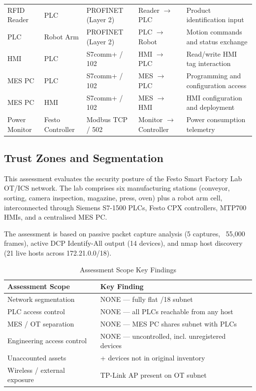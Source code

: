 {\begin{longtable}{p{2.2cm} p{2.2cm} p{2.6cm} p{3.2cm} p{4.2cm}}
RFID Reader & PLC &
PROFINET (Layer 2) &
Reader $\rightarrow$ PLC &
Product identification input \\

PLC & Robot Arm &
PROFINET (Layer 2) &
PLC $\rightarrow$ Robot &
Motion commands and status exchange \\

HMI & PLC &
S7comm+ / 102 &
HMI $\rightarrow$ PLC &
Read/write HMI tag interaction \\

MES PC & PLC &
S7comm+ / 102 &
MES $\rightarrow$ PLC &
Programming and configuration access \\

MES PC & HMI &
S7comm+ / 102 &
MES $\rightarrow$ HMI &
HMI configuration and deployment \\

Power Monitor & Festo Controller &
Modbus TCP / 502 &
Monitor $\rightarrow$ Controller &
Power consumption telemetry \\

\end{longtable}
}


\subsection{Trust Zones and Segmentation}

This assessment evaluates the security posture of the Festo Smart Factory Lab OT/ICS network. The lab comprises six manufacturing stations (conveyor, sorting, camera inspection, magazine, press, oven) plus a robot arm cell, interconnected through Siemens S7-1500 PLCs, Festo CPX controllers, MTP700 HMIs, and a centralised MES PC.

The assessment is based on passive packet capture analysis (5 captures, ~55,000 frames), active DCP Identify-All output (14 devices), and nmap host discovery (21 live hosts across 172.21.0.0/18).

\begin{table}[h!]
\centering

\begin{tabular}{@{}l>{\raggedright\arraybackslash}p{}@{}}
\toprule
\textbf{Assessment Scope} & \textbf{Key Finding} \\
\midrule
Network segmentation & NONE — fully flat /18 subnet \\
PLC access control & NONE — all PLCs reachable from any host \\
MES / OT separation & NONE — MES PC shares subnet with PLCs \\
Engineering access control & NONE — uncontrolled, incl. unregistered devices \\
Unaccounted assets & 6+ devices not in original inventory \\
Wireless / external exposure & TP-Link AP present on OT subnet \\
\bottomrule
\end{tabular}
\caption{Assessment Scope Key Findings}
\end{table}


